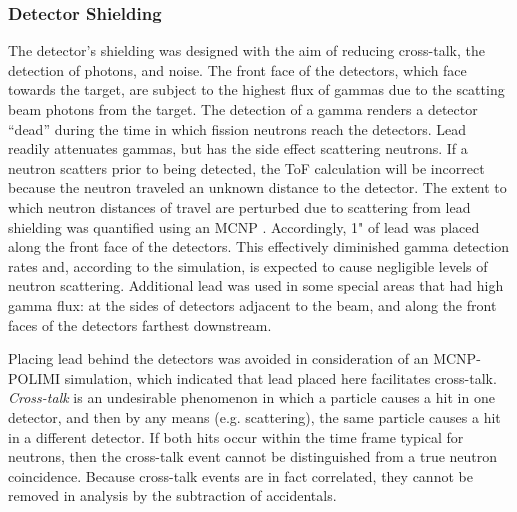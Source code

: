 \subsubsection{Detector Shielding}

The detector's shielding was designed with the aim of reducing cross-talk, the detection of photons, and noise.
The front face of the detectors, which face towards the target, are subject to the highest flux of gammas due to the scatting beam photons from the target.
The detection of a gamma renders a detector ``dead'' during the time in which fission neutrons reach the detectors.
Lead readily attenuates gammas, but has the side effect scattering neutrons.
If a neutron scatters prior to being detected, the ToF calculation will be incorrect because the neutron traveled an unknown distance to the detector.
The extent to which neutron distances of travel are perturbed due to scattering from lead shielding was quantified using an MCNP .
Accordingly, 1" of lead was placed along the front face of the detectors.
This effectively diminished gamma detection rates and, according to the simulation, is expected to cause negligible levels of neutron scattering.
Additional lead was used in some special areas that had high gamma flux: at the sides of detectors adjacent to the beam, and along the front faces of the detectors farthest downstream.

Placing lead behind the detectors was avoided in consideration of an MCNP-POLIMI simulation, which indicated that lead placed here facilitates cross-talk. \textit{Cross-talk} is an undesirable phenomenon in which a particle causes a hit in one detector, and then by any means (e.g.  scattering), the same particle causes a hit in a different detector.
If both hits occur within the time frame typical for neutrons, then the cross-talk event cannot be distinguished from a true neutron coincidence.
Because cross-talk events are in fact correlated, they cannot be removed in analysis by the subtraction of accidentals.

